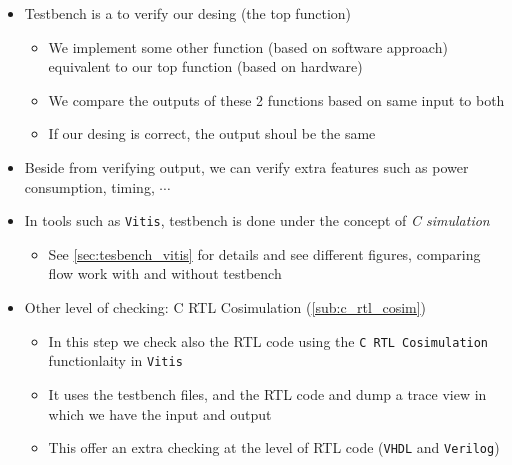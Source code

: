 \begin{itemize}

\item Testbench is a  to verify our desing (the top function)

	\begin{itemize}
	
	\item We implement some other function (based on software approach) equivalent to our top function (based on hardware)
	
	\item We compare the outputs of these 2 functions based on same input to both
	
	\item If our desing is correct, the output shoul be the same
	\end{itemize}

\item Beside from verifying output, we can verify extra features such as power consumption, timing, $\cdots$

\item In tools such as \verb|Vitis|, testbench is done under the concept of \textit{C simulation}

	\begin{itemize}
	\item See \ref{sec:tesbench_vitis} for details and see different figures, comparing flow work with and without testbench
	\end{itemize}

\item Other level of checking: C RTL Cosimulation (\ref{sub:c_rtl_cosim})

	\begin{itemize}
	\item In this step we check also the RTL code using the \verb|C RTL Cosimulation| functionlaity in \verb|Vitis|
	
	\item It uses the testbench files, and the RTL code and dump a trace view in which we have the input and output
	
	\item This offer an extra checking at the level of RTL code (\verb|VHDL| and \verb|Verilog|)
	
	\end{itemize}

\end{itemize}






